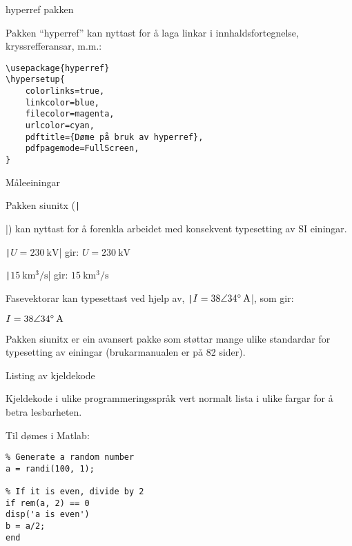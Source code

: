 	\begin{frame}[containsverbatim]{hyperref pakken}
	
	Pakken ``hyperref'' kan nyttast for å laga linkar i innhaldsfortegnelse, kryssrefferansar, m.m.:
	
	\begin{verbatim}
\usepackage{hyperref}
\hypersetup{
	colorlinks=true,
	linkcolor=blue,
	filecolor=magenta,      
	urlcolor=cyan,
	pdftitle={Døme på bruk av hyperref},
	pdfpagemode=FullScreen,
}
	\end{verbatim}

\end{frame}





\begin{frame}[containsverbatim]{Måleeiningar}
	
	Pakken siunitx (\texttt|\usepackage{siunitx}|) kan nyttast for å forenkla arbeidet med konsekvent typesetting av SI einingar.
	
	\texttt|\(U = \SI{230}{\kilo\volt}\)| gir: \(U = \SI{230}{\kilo\volt}\)
	
	\texttt|\(\SI{15}{\kilo\meter\cubed\per\second}\)| gir: \(\SI{15}{\kilo\meter\cubed\per\second}\)
	
	Fasevektorar kan typesettast ved hjelp av, \texttt|\(I = \complexqty{38:34}{\ampere}\)|, som gir:
	
	\(I = \complexqty{38:34}{\ampere}\)
	

        Pakken siunitx er ein avansert pakke som støttar mange ulike standardar for typesetting av einingar (brukarmanualen er på 82 sider).
        
\end{frame}




\begin{frame}[containsverbatim]{Listing av kjeldekode}
	
	Kjeldekode i ulike programmeringsspråk vert normalt lista i ulike fargar for å betra lesbarheten.
	
	Til dømes i Matlab:
	
	\begin{verbatim}
% Generate a random number
a = randi(100, 1);

% If it is even, divide by 2
if rem(a, 2) == 0
disp('a is even')
b = a/2;
end
	\end{verbatim}
	
\end{frame}




